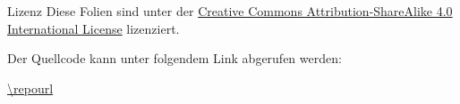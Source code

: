 
\begin{frame}{Lizenz}
    Diese Folien sind unter der
    \href{https://creativecommons.org/licenses/by-sa/4.0/}{Creative Commons
    Attribution-\allowbreak ShareAlike 4.0 International License} lizenziert.
    \ccbysa

    \vspace{1em}

    Der Quellcode kann unter folgendem Link abgerufen werden:

    \url{\repourl}
\end{frame}
